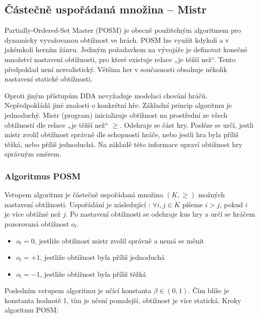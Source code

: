 \subsection{Částečně uspořádaná množina – Mistr}

Partially-Ordered-Set Master (POSM) \cite{22posm1} je obecně použitelným algoritmem pro dynamicky vyvažovanou obtížnost ve hrách. POSM lze využít kdykoli a v jakémkoli herním žánru. Jediným požadavkem na vývojáře je definovat konečné množství nastavení obtížnosti, pro které existuje relace „je těžší než“. Tento předpoklad není nerealistický. Většina her v současnosti obsahuje několik nastavení statické obtížnosti.

Oproti jiným přístupům DDA nevyžaduje modelaci chování hráčů. Nepředpokládá jiné znalosti o konkrétní hře. 
Základní princip algoritmu je jednoduchý. Mistr (program) inicializuje obtížnost na prostřední ze všech obtížností dle relace „je těžší než“ $\geq$. Odehraje se část hry. Posléze se určí, jestli mistr zvolil obtížnost správně dle schopností hráče, nebo jestli hra byla příliš těžká, nebo příliš jednoduchá. Na základě této informace upraví obtížnost hry správným směrem.

\subsubsection{Algoritmus POSM}

Vstupem algoritmu je částečně uspořádaná množina $(K,\geq)$ možných nastavení obtížnosti. Uspořádání je následující : $\forall i,j \in K$ píšeme $i>j$, pokud $i$ je více obtížné než $j$.
Po nastavení obtížnosti se odehraje kus hry a určí se hráčem pozorovaná obtížnost $o_t$.

\begin{itemize}
	\item $o_t=0$, jestliže obtížnost mistr zvolil správně a nemá se měnit
	\item $o_t=+1$, jestliže obtížnost byla příliš jednoduchá
	\item $o_t=-1$, jestliže obtížnost byla příliš těžká
\end{itemize}
	
Posledním vstupem algoritmu je učící konstanta $\beta\in(0,1)$. Čím blíže je konstanta hodnotě 1, tím je učení pomalejší, obtížnost je více statická.
Kroky algoritmu POSM:

